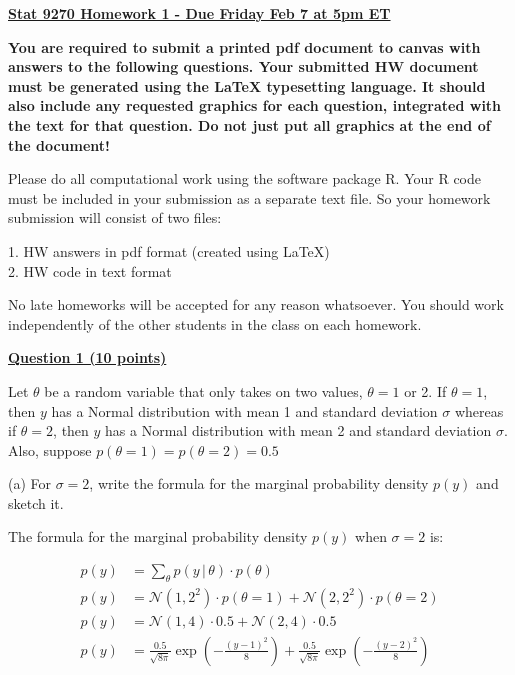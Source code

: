 \documentclass[12pt]{article}
\begin{document}
\begin{center}
{\large{\bf {\underline{Stat 9270 Homework 1 - Due Friday Feb 7 at 5pm ET}}}}
\end{center}

{\bf You are required to submit a printed pdf document to canvas with answers to the following questions.  Your submitted HW document must be generated using the LaTeX typesetting language. It should also include any requested graphics for each question, integrated with the text for that question. Do not just put all graphics at the end of the document!

Please do all computational work using the software package R. Your R code must be included in your submission as a separate text file. So your homework submission will consist of two files:

1. HW answers in pdf format (created using LaTeX) \\
2. HW code in text format

No late homeworks will be accepted for any reason whatsoever. You should work independently of the other students in the class on each homework.
}

\bigskip

{\underline{\bf Question 1 (10 points)}}  

Let $\theta$ be a random variable that only takes on two values, $\theta = 1$ or 2. If $\theta = 1$, then $y$ has a Normal distribution with mean 1 and standard deviation $\sigma$ whereas if $\theta = 2$, then $y$ has a Normal distribution with mean 2 and standard deviation $\sigma$. Also, suppose $p(\theta = 1) = p(\theta = 2) = 0.5$

(a) For $\sigma = 2$, write the formula for the marginal probability density $p(y)$ and sketch it.

The formula for the marginal probability density $p(y)$ when $\sigma = 2$ is:

\begin{align*}
p(y) &= \sum_{\theta} p(y \, | \, \theta) \cdot p(\theta) \\
p(y) &= \mathcal{N}(1, 2^2) \cdot p(\theta = 1) + \mathcal{N}(2, 2^2) \cdot p(\theta = 2) \\
p(y) &= \mathcal{N}(1, 4) \cdot 0.5 + \mathcal{N}(2, 4) \cdot 0.5 \\
p(y) &= \frac{0.5}{\sqrt{8\pi}} \exp\left( -\frac{(y-1)^2}{8} \right) + \frac{0.5}{\sqrt{8\pi}} \exp\left( -\frac{(y-2)^2}{8} \right)
\end{align*}
\end{document}
